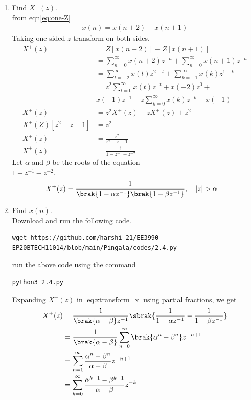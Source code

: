 \documentclass[journal,12pt,twocolumn]{IEEEtran}
\renewcommand\thesection{\arabic{section}}
\begin{document}
\begin{enumerate}[label=\thesection.\arabic*,ref=\thesection.\theenumi]
\item 		Find $X^{+}(z)$.\\
\solution 
from eqn\eqref{eq:one-Z} 
\begin{align}
	x(n) = x(n+2) - x(n+1)
\end{align}
Taking one-sided $z$-transform on both sides.
\begin{align}
	X^+(z) &= Z[x(n+2)] -Z[x(n+1)]\\
	&= \sum_{n=0}^{\infty}x(n+2)z^{-n} +\sum_{n=0}^{\infty}x(n+1)z^{-n} \\
	&= \sum_{t=-2}^{\infty}x(t)z^{2-t} +\sum_{k=-1}^{\infty}x(k)z^{1-k} \\
	&= z^2\sum_{t=0}^{\infty}x(t)z^{-t} + x(-2) z^0 + \nonumber\\
	& x(-1)z^{-1}+z\sum_{k=0}^{\infty}x(k)z^{-k} +x(-1)\\
	X^+(z)&= z^2 X^+(z)-z X^+(z)+z^{2}\\
	X^+(Z)[z^2-z-1]&= z^2\\
	X^+(z) &= \frac{z^2}{z^2-z-1}\\ 
	X^+(z) &= \frac{1}{1-z^{-1}-z^{-2}}
\end{align}
Let $\alpha$ and $\beta$ be the roots of the equation \\$1-z^{-1}-z^{-2}$.
\begin{align}\label{eq:ztransform_x}
	X^+(z) &= \frac{1}{\brak{1 - \alpha z^{-1}}\brak{1 - \beta z^{-1}}}, \quad |z| > \alpha
\end{align}
\item Find $x(n)$.\\
\solution 
Download and run the following code.
\begin{lstlisting}
wget https://github.com/harshi-21/EE3990-EP20BTECH11014/blob/main/Pingala/codes/2.4.py
\end{lstlisting}
run the above code using the command
\begin{lstlisting}
python3 2.4.py
\end{lstlisting}
Expanding $X^+(z)$ in \eqref{eq:ztransform_x} using partial fractions, we get
\begin{align}
    X^+(z) &= \frac{1}{\brak{\alpha - \beta}z^{-1}}\sbrak{\frac{1}{1 - \alpha z^{-1}} - \frac{1}{1 - \beta z^{-1}}} \\
           &= \frac{1}{\brak{\alpha - \beta}}\sum_{n = 0}^{\infty}\brak{\alpha^n - \beta^n}z^{-n + 1} \\
           &= \sum_{n = 1}^{\infty}\frac{\alpha^{n} - \beta^{n}}{\alpha - \beta}z^{-n + 1} \\
           &= \sum_{k = 0}^{\infty}\frac{\alpha^{k + 1} - \beta^{k + 1}}{\alpha - \beta}z^{-k}

\end{align}
\end{enumerate}
\end{document}
